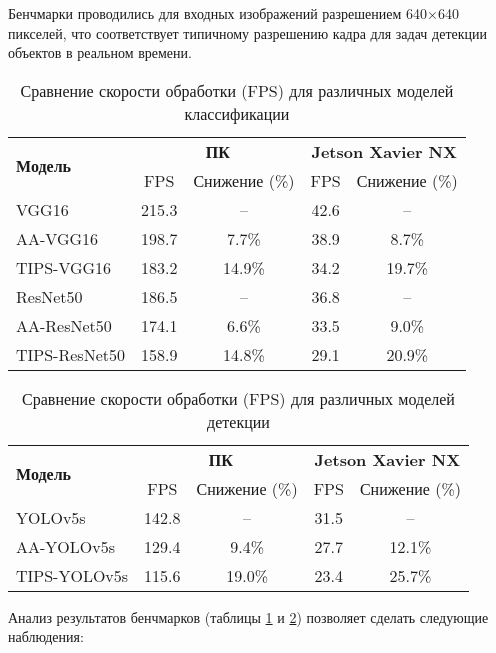 Бенчмарки проводились для входных изображений разрешением 640×640 пикселей, что соответствует типичному разрешению кадра для задач детекции объектов в реальном времени.

\begin{table}[ht]
\centering
\caption{Сравнение скорости обработки (FPS) для различных моделей классификации}
\label{tab:fps_classification}
\begin{tabular}{|l|c|c|c|c|}
\hline
\multirow{2}{*}{\textbf{Модель}} & \multicolumn{2}{c|}{\textbf{ПК}} & \multicolumn{2}{c|}{\textbf{Jetson Xavier NX}} \\ \cline{2-5}
 & FPS & Снижение (\%) & FPS & Снижение (\%) \\ \hline
VGG16 & 215.3 & -- & 42.6 & -- \\ \hline
AA-VGG16 & 198.7 & 7.7\% & 38.9 & 8.7\% \\ \hline
TIPS-VGG16 & 183.2 & 14.9\% & 34.2 & 19.7\% \\ \hline
ResNet50 & 186.5 & -- & 36.8 & -- \\ \hline
AA-ResNet50 & 174.1 & 6.6\% & 33.5 & 9.0\% \\ \hline
TIPS-ResNet50 & 158.9 & 14.8\% & 29.1 & 20.9\% \\ \hline
\end{tabular}
\end{table}

\begin{table}[ht]
\centering
\caption{Сравнение скорости обработки (FPS) для различных моделей детекции}
\label{tab:fps_detection}
\begin{tabular}{|l|c|c|c|c|}
\hline
\multirow{2}{*}{\textbf{Модель}} & \multicolumn{2}{c|}{\textbf{ПК}} & \multicolumn{2}{c|}{\textbf{Jetson Xavier NX}} \\ \cline{2-5}
 & FPS & Снижение (\%) & FPS & Снижение (\%) \\ \hline
YOLOv5s & 142.8 & -- & 31.5 & -- \\ \hline
AA-YOLOv5s & 129.4 & 9.4\% & 27.7 & 12.1\% \\ \hline
TIPS-YOLOv5s & 115.6 & 19.0\% & 23.4 & 25.7\% \\ \hline
\end{tabular}
\end{table}

Анализ результатов бенчмарков (таблицы \ref{tab:fps_classification} и \ref{tab:fps_detection}) позволяет сделать следующие наблюдения:

